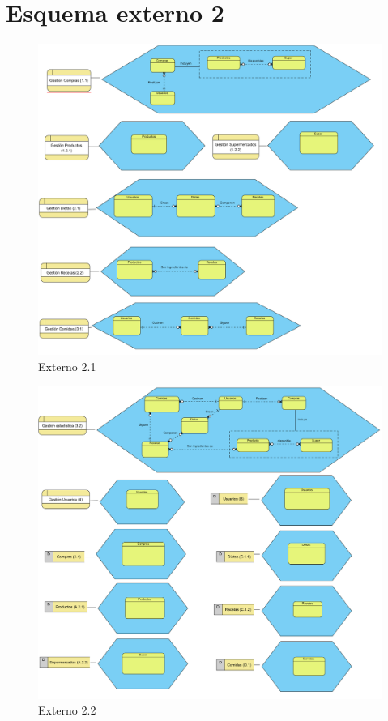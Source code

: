 \documentclass[a4paper,12pt]{report}
\begin{document}
\section{Esquema externo 2}
\label{sec-6-2}
\begin{figure}[!htp]
\centering
\includegraphics[width=0.9\linewidth]{./refinamientos/externo21.png}
\caption{Externo 2.1}
\label{fig:Externo 2.1}
\medskip
\footnotesize
{}
\end{figure}

\begin{figure}[!htp]
\centering
\includegraphics[width=0.9\linewidth]{./refinamientos/externo22.png}
\caption{Externo 2.2}
\label{fig:Externo 2.2}
\medskip
\footnotesize
{}
\end{figure}
\end{document}

